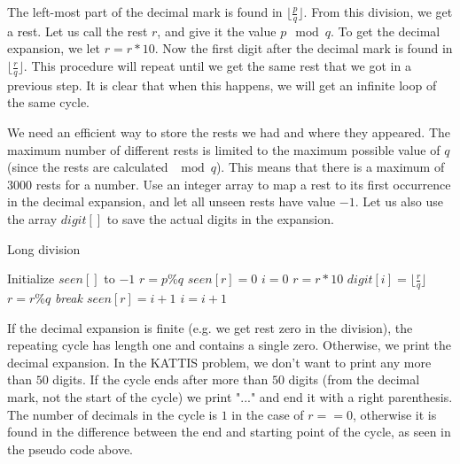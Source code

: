 \documentclass[11pt,a4paper,twoside]{article}
\begin{document}
The left-most part of the decimal mark is found in
$\lfloor{\frac{p}{q}}\rfloor$. From this division, we get a rest. Let us call
the rest $r$, and give it the value $p \mod q$. To get the decimal expansion,
we let $r = r * 10$. Now the first digit after the decimal mark is found in
$\lfloor{\frac{r}{q}}\rfloor$. This procedure will repeat until we get the same
rest that we got in a previous step. It is clear that when this happens, we
will get an infinite loop of the same cycle.

We need an efficient way to store the rests we had and where they appeared. The
maximum number of different rests is limited to the maximum possible value of
$q$ (since the rests are calculated $\mod q$). This means that there is a
maximum of $3000$ rests for a number. Use an integer array to map a rest to its
first occurrence in the decimal expansion, and let all unseen rests have value
$-1$.  Let us also use the array $digit[]$ to save the actual digits in the
expansion.


\begin{algorithm}
    \caption{Long division}
    \label{lst:Long division}
    \begin{algorithmic}
        \STATE Initialize $seen[]$ to $-1$
        \STATE $r = p \% q$
        \STATE $seen[r] = 0$ 
        \STATE $i = 0$
            \STATE $r = r * 10$
            \STATE $digit[i] = \lfloor\frac{r}{q}\rfloor$
            \STATE $r = r \% q$
                \STATE {}
                \STATE \em{break} %
            \ENDIF
            \STATE $seen[r] = i + 1 $
            \STATE $ i = i + 1$
        \ENDWHILE
    \end{algorithmic}
\end{algorithm}

       
If the decimal expansion is finite (e.g. we get rest zero in the division), the
repeating cycle has length one and contains a single zero. Otherwise, we print
the decimal expansion. In the KATTIS problem, we don't want to print any more
than $50$ digits. If the cycle ends after more than $50$ digits (from the
decimal mark, not the start of the cycle) we print "..." and end it with a
right parenthesis. The number of decimals in the cycle is $1$ in the case of
$r==0$, otherwise it is found in the difference between the end and starting
point of the cycle, as seen in the pseudo code above.
\end{document}
